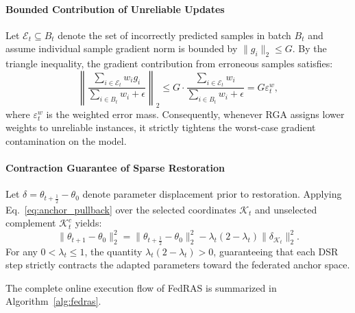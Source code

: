 \documentclass[journal]{IEEEtran}
\begin{document}
\paragraph*{Bounded Contribution of Unreliable Updates}
Let $\mathcal{E}_t \subseteq B_t$ denote the set of incorrectly predicted samples in batch $B_t$ and assume individual sample gradient norm is bounded by $\|g_i\|_2 \le G$. By the triangle inequality, the gradient contribution from erroneous samples satisfies:
\begin{equation}
\label{eq:grad_bound}
\left\| \frac{\sum_{i \in \mathcal{E}_t} w_i g_i}{\sum_{i \in B_t} w_i + \epsilon} \right\|_2 \le G \cdot \frac{\sum_{i \in \mathcal{E}_t} w_i}{\sum_{i \in B_t} w_i + \epsilon} = G \varepsilon_t^w,
\end{equation}
where $\varepsilon_t^w$ is the weighted error mass. Consequently, whenever RGA assigns lower weights to unreliable instances, it strictly tightens the worst-case gradient contamination on the model.

\paragraph*{Contraction Guarantee of Sparse Restoration}
Let $\delta = \theta_{t+\frac{1}{2}} - \theta_0$ denote parameter displacement prior to restoration. Applying Eq.~\eqref{eq:anchor_pullback} over the selected coordinates $\mathcal{K}_t$ and unselected complement $\mathcal{K}_t^c$ yields:
\begin{equation}
\label{eq:contraction}
\|\theta_{t+1} - \theta_0\|_2^2 = \|\theta_{t+\frac{1}{2}} - \theta_0\|_2^2 - \lambda_t(2 - \lambda_t) \|\delta_{\mathcal{K}_t}\|_2^2.
\end{equation}
For any $0 < \lambda_t \le 1$, the quantity $\lambda_t(2 - \lambda_t) > 0$, guaranteeing that each DSR step strictly contracts the adapted parameters toward the federated anchor space.

The complete online execution flow of FedRAS is summarized in Algorithm~\ref{alg:fedras}.
\end{document}
